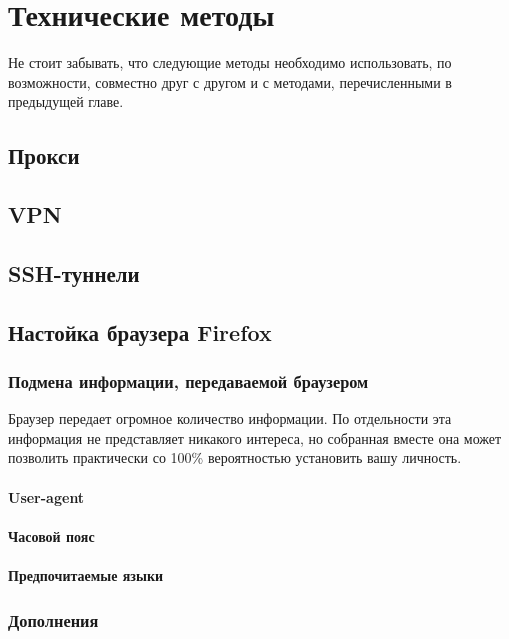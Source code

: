 \chapter{Технические методы}
\begin{important}
Не стоит забывать, что следующие методы необходимо использовать, по возможности, совместно друг с другом и с методами, перечисленными в предыдущей главе.
\end{important}
\section{Прокси}

\section{VPN}

\section{SSH-туннели}

\section{Настойка браузера Firefox}
\subsection{Подмена информации, передаваемой браузером}
\begin{important}
Браузер передает огромное количество информации. По отдельности эта информация не представляет никакого интереса, но собранная вместе она может позволить практически со 100\% вероятностью установить вашу личность.
\end{important}
\subsubsection{User-agent}
\subsubsection{Часовой пояс}
\subsubsection{Предпочитаемые языки}
\subsection{Дополнения}
